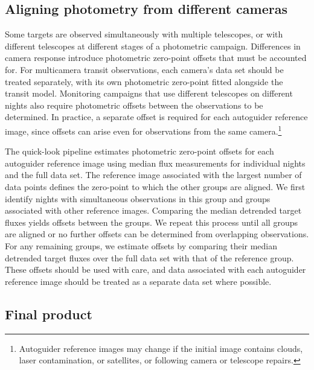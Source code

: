 \documentclass[fleqn,usenatbib]{mnras}
\begin{document}
\subsection{Aligning photometry from different cameras}\label{sec:aligning_photometry}

Some targets are observed simultaneously with multiple telescopes, or with different telescopes at different stages of a photometric campaign. Differences in camera response introduce photometric zero-point offsets that must be accounted for. For multicamera transit observations, each camera's data set should be treated separately, with its own photometric zero-point fitted alongside the transit model. Monitoring campaigns that use different telescopes on different nights also require photometric offsets between the observations to be determined. In practice, a separate offset is required for each autoguider reference image, since offsets can arise even for observations from the same camera.\footnote{Autoguider reference images may change if the initial image contains clouds, laser contamination, or satellites, or following camera or telescope repairs.}

The quick-look pipeline estimates photometric zero-point offsets for each autoguider reference image using median flux measurements for individual nights and the full data set. The reference image associated with the largest number of data points defines the zero-point to which the other groups are aligned. We first identify nights with simultaneous observations in this group and groups associated with other reference images. Comparing the median detrended target fluxes yields offsets between the groups. We repeat this process until all groups are aligned or no further offsets can be determined from overlapping observations. For any remaining groups, we estimate offsets by comparing their median detrended target fluxes over the full data set with that of the reference group. These offsets should be used with care, and data associated with each autoguider reference image should be treated as a separate data set where possible.


\subsection{Final product}\label{sec:final_product}
\end{document}
